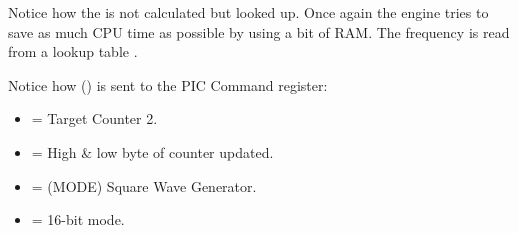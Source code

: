 \documentclass[book.tex]{subfiles}
\begin{document}
Notice how the  is not calculated but looked up. Once again the engine tries to save as much CPU time as possible by using a bit of RAM. The frequency is read from a lookup table .\\
\par
\begin{minipage}{\textwidth}

\end{minipage}
\par
Notice how  () is sent to the PIC Command register:
\begin{itemize}
	\item {} = Target Counter 2.
 	\item {} = High \& low byte of counter updated.
	\item {} = (MODE) Square Wave Generator.
	\item {} = 16-bit mode.
\end{itemize}
\par
\end{document}
